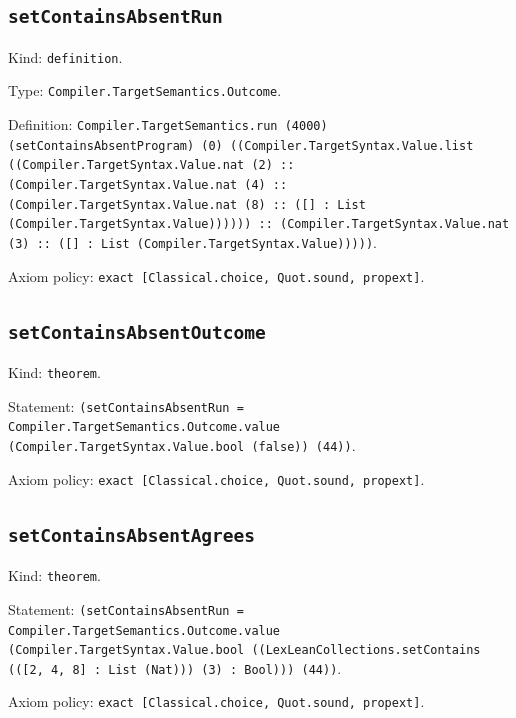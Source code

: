 \documentclass[11pt]{article}
\begin{document}
\subsection*{\texttt{setContainsAbsentRun}}
\noindent Kind: \texttt{definition}.\par
\noindent Type: \texttt{Compiler.TargetSemantics.Outcome}.\par
\noindent Definition: \texttt{Compiler.TargetSemantics.run (4000) (setContainsAbsentProgram) (0) ((Compiler.TargetSyntax.Value.list ((Compiler.TargetSyntax.Value.nat (2) :: (Compiler.TargetSyntax.Value.nat (4) :: (Compiler.TargetSyntax.Value.nat (8) :: ([] : List (Compiler.TargetSyntax.Value)))))) :: (Compiler.TargetSyntax.Value.nat (3) :: ([] : List (Compiler.TargetSyntax.Value)))))}.\par
\noindent Axiom policy: \texttt{exact [Classical.choice, Quot.sound, propext]}.\par
\subsection*{\texttt{setContainsAbsentOutcome}}
\noindent Kind: \texttt{theorem}.\par
\noindent Statement: \texttt{(setContainsAbsentRun = Compiler.TargetSemantics.Outcome.value (Compiler.TargetSyntax.Value.bool (false)) (44))}.\par
\noindent Axiom policy: \texttt{exact [Classical.choice, Quot.sound, propext]}.\par
\subsection*{\texttt{setContainsAbsentAgrees}}
\noindent Kind: \texttt{theorem}.\par
\noindent Statement: \texttt{(setContainsAbsentRun = Compiler.TargetSemantics.Outcome.value (Compiler.TargetSyntax.Value.bool ((LexLeanCollections.setContains (([2, 4, 8] : List (Nat))) (3) : Bool))) (44))}.\par
\noindent Axiom policy: \texttt{exact [Classical.choice, Quot.sound, propext]}.\par
\end{document}
